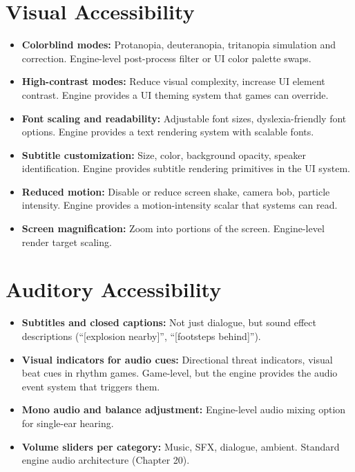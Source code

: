 \documentclass[
  11pt,
  letterpaper,
  DIV=11,
  numbers=noendperiod,
  twoside,
  open=right]{scrreprt}
\providecommand{\tightlist}{%
  \setlength{\itemsep}{0pt}\setlength{\parskip}{0pt}}
\begin{document}
\section{Visual Accessibility}\label{visual-accessibility}

\begin{itemize}
\tightlist
\item
  \textbf{Colorblind modes:} Protanopia, deuteranopia, tritanopia
  simulation and correction. Engine-level post-process filter or UI
  color palette swaps.
\item
  \textbf{High-contrast modes:} Reduce visual complexity, increase UI
  element contrast. Engine provides a UI theming system that games can
  override.
\item
  \textbf{Font scaling and readability:} Adjustable font sizes,
  dyslexia-friendly font options. Engine provides a text rendering
  system with scalable fonts.
\item
  \textbf{Subtitle customization:} Size, color, background opacity,
  speaker identification. Engine provides subtitle rendering primitives
  in the UI system.
\item
  \textbf{Reduced motion:} Disable or reduce screen shake, camera bob,
  particle intensity. Engine provides a motion-intensity scalar that
  systems can read.
\item
  \textbf{Screen magnification:} Zoom into portions of the screen.
  Engine-level render target scaling.
\end{itemize}

\section{Auditory Accessibility}\label{auditory-accessibility}

\begin{itemize}
\tightlist
\item
  \textbf{Subtitles and closed captions:} Not just dialogue, but sound
  effect descriptions (``{[}explosion nearby{]}'', ``{[}footsteps
  behind{]}'').
\item
  \textbf{Visual indicators for audio cues:} Directional threat
  indicators, visual beat cues in rhythm games. Game-level, but the
  engine provides the audio event system that triggers them.
\item
  \textbf{Mono audio and balance adjustment:} Engine-level audio mixing
  option for single-ear hearing.
\item
  \textbf{Volume sliders per category:} Music, SFX, dialogue, ambient.
  Standard engine audio architecture (Chapter 20).
\end{itemize}
\end{document}
